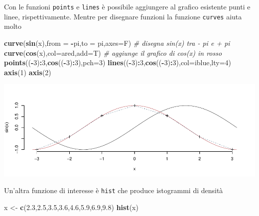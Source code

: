 \documentclass[
  11pt,
]{book}
\newenvironment{Shaded}{\begin{snugshade}}{\end{snugshade}}
\newcommand{\AttributeTok}[1]{\textcolor[rgb]{0.13,0.29,0.53}{#1}}
\newcommand{\CommentTok}[1]{\textcolor[rgb]{0.56,0.35,0.01}{\textit{#1}}}
\newcommand{\DecValTok}[1]{\textcolor[rgb]{0.00,0.00,0.81}{#1}}
\newcommand{\FloatTok}[1]{\textcolor[rgb]{0.00,0.00,0.81}{#1}}
\newcommand{\FunctionTok}[1]{\textcolor[rgb]{0.13,0.29,0.53}{\textbf{#1}}}
\newcommand{\NormalTok}[1]{#1}
\newcommand{\OtherTok}[1]{\textcolor[rgb]{0.56,0.35,0.01}{#1}}
\newcommand{\SpecialCharTok}[1]{\textcolor[rgb]{0.81,0.36,0.00}{\textbf{#1}}}
\theoremstyle{mytheoremstyle}
\theoremstyle{mydefstyle}
\begin{document}
Con le funzioni \texttt{points} e \texttt{lines} è possibile aggiungere al grafico esistente
punti e linee, rispettivamente. Mentre per disegnare funzioni la funzione \texttt{curves}
aiuta molto

\begin{Shaded}
\begin{Highlighting}[]
\FunctionTok{curve}\NormalTok{(}\FunctionTok{sin}\NormalTok{(x),}\AttributeTok{from =} \SpecialCharTok{{-}}\NormalTok{pi,}\AttributeTok{to =}\NormalTok{ pi,}\AttributeTok{axes=}\NormalTok{F) }\CommentTok{\# disegna sin(x) tra {-} pi e + pi }
\FunctionTok{curve}\NormalTok{(}\FunctionTok{cos}\NormalTok{(x),}\AttributeTok{col=}\NormalTok{ared,}\AttributeTok{add=}\NormalTok{T)           }\CommentTok{\# aggiunge il grafico di cos(x) in rosso}
\FunctionTok{points}\NormalTok{((}\SpecialCharTok{{-}}\DecValTok{3}\NormalTok{)}\SpecialCharTok{:}\DecValTok{3}\NormalTok{,}\FunctionTok{cos}\NormalTok{((}\SpecialCharTok{{-}}\DecValTok{3}\NormalTok{)}\SpecialCharTok{:}\DecValTok{3}\NormalTok{),}\AttributeTok{pch=}\DecValTok{3}\NormalTok{)}
\FunctionTok{lines}\NormalTok{((}\SpecialCharTok{{-}}\DecValTok{3}\NormalTok{)}\SpecialCharTok{:}\DecValTok{3}\NormalTok{,}\FunctionTok{cos}\NormalTok{((}\SpecialCharTok{{-}}\DecValTok{3}\NormalTok{)}\SpecialCharTok{:}\DecValTok{3}\NormalTok{),}\AttributeTok{col=}\NormalTok{iblue,}\AttributeTok{lty=}\DecValTok{4}\NormalTok{)}
\FunctionTok{axis}\NormalTok{(}\DecValTok{1}\NormalTok{)}
\FunctionTok{axis}\NormalTok{(}\DecValTok{2}\NormalTok{)}
\end{Highlighting}
\end{Shaded}

\begin{center}\includegraphics{Appunti_di_Statistica_2025_files/figure-latex/24-Libro-26-1} \end{center}

Un'altra funzione di interesse è \texttt{hist} che produce istogrammi di densità

\begin{Shaded}
\begin{Highlighting}[]
\NormalTok{x }\OtherTok{\textless{}{-}} \FunctionTok{c}\NormalTok{(}\FloatTok{2.3}\NormalTok{,}\FloatTok{2.5}\NormalTok{,}\FloatTok{3.5}\NormalTok{,}\FloatTok{3.6}\NormalTok{,}\FloatTok{4.6}\NormalTok{,}\FloatTok{5.9}\NormalTok{,}\FloatTok{6.9}\NormalTok{,}\FloatTok{9.8}\NormalTok{)}
\FunctionTok{hist}\NormalTok{(x)}
\end{Highlighting}
\end{Shaded}
\end{document}
